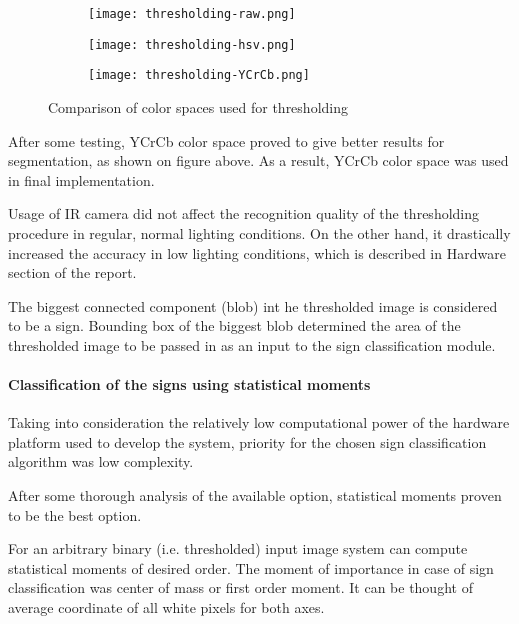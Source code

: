 \begin{figure}[th!]
	\centering
	\begin{subfigure}[b]{0.3\textwidth}
		\centering
	\texttt{[image: thresholding-raw.png]}
	\end{subfigure}
	\begin{subfigure}[b]{0.3\textwidth}
		\centering
		\texttt{[image: thresholding-hsv.png]}
	\end{subfigure}
	\begin{subfigure}[b]{0.3\textwidth}
		\centering
		\texttt{[image: thresholding-YCrCb.png]}
	\end{subfigure}
	\caption{Comparison of color spaces used for thresholding}
	\label{fig:color-spaces}
\end{figure}

After some testing, YCrCb color space proved to give better results for segmentation, as shown on figure above. As a result, YCrCb color space was used in final implementation.

Usage of IR camera did not affect the recognition quality of the thresholding procedure in regular, normal lighting conditions. On the other hand, it drastically increased the accuracy in low lighting conditions, which is described in Hardware section of the report.

The biggest connected component (blob) int he thresholded image is considered to be a sign. Bounding box of the biggest blob determined the area of the thresholded image to be passed in as an input to the sign classification module. 

\paragraph{Classification of the signs using statistical moments}

Taking into consideration the relatively low computational power of the hardware platform used to develop the system, priority for the chosen sign classification algorithm was low complexity.

After some thorough analysis of the available option, statistical moments proven to be the best option.

For an arbitrary binary (i.e. thresholded) input image system can compute statistical moments of desired order. The moment of importance in case of sign classification was center of mass or first order moment. It can be thought of average coordinate of all white pixels for both axes.

